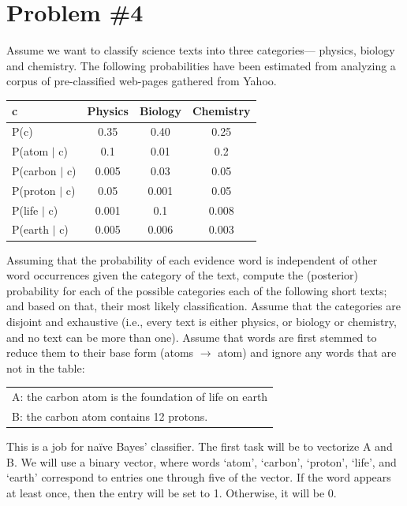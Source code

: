 \documentclass[12pt]{article}
\begin{document}
	\section*{Problem \#4}
	Assume we want to classify science texts into three categories— physics, biology and chemistry. The  following  probabilities  have  been  estimated  from  analyzing  a  corpus  of  pre-classified  web-pages gathered from Yahoo.
		\begin{center}
			\begin{tabular*}{245pt}[t]{l | c c c}
				c & Physics & Biology & Chemistry \\
				\hline
				P(c) & 0.35 & 0.40 & 0.25  \\
				P(atom $\vert$ c) & 0.1 & 0.01 & 0.2 \\
				P(carbon $\vert$ c) & 0.005 & 0.03 & 0.05 \\
				P(proton $\vert$ c) & 0.05 & 0.001 & 0.05  \\
				P(life $\vert$ c) & 0.001 & 0.1 & 0.008 \\
				P(earth $\vert$ c) & 0.005 & 0.006 & 0.003  \\
			\end{tabular*}
		\end{center}
	Assuming that the probability of each evidence word is independent of other word occurrences given the category of the text, compute the (posterior) probability for each of the possible categories each of the following short texts; and based on that, their most likely classification. Assume that the categories are disjoint and exhaustive (i.e., every text is either physics, or biology or chemistry, and no text can be more than one). Assume that words are first stemmed to reduce them to their base form (atoms $\rightarrow$ atom) and ignore any words that are not in the table:
	\begin{center}
	\begin{tabular*}{250pt}[t]{l}
	A: the carbon atom is the foundation of life on earth \\
	B: the carbon atom contains 12 protons. \\
	\end{tabular*}
	\end{center}
	This is a job for na\"ive Bayes' classifier. The first task will be to vectorize A and B. We will use a binary vector, where words `atom', `carbon', `proton', `life', and `earth' correspond to entries one through five of the vector. If the word appears at least once, then the entry will be set to 1. Otherwise, it will be 0.
\end{document}
